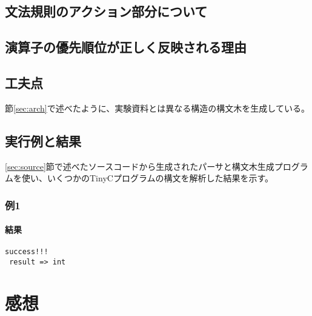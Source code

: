\documentclass[titlepage, a4paper,12pt]{jarticle}
\begin{document}
\subsection{文法規則のアクション部分について}
\subsection{演算子の優先順位が正しく反映される理由}
\subsection{工夫点}
節\ref{sec:arch}で述べたように、実験資料とは異なる構造の構文木を生成している。
\subsection{実行例と結果}
\ref{sec:source}節で述べたソースコードから生成されたパーサと構文木生成プログラムを使い、いくつかのTinyCプログラムの構文を解析した結果を示す。
\subsubsection{例1}

\paragraph{結果}
\begin{verbatim}
success!!! 
 result => int
\end{verbatim}
\section{感想}
\end{document}

